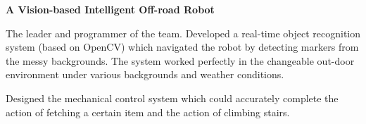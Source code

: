 \documentclass[margin,line,11pt]{resume}
\begin{document}
\begin{resume}
\textbf{A Vision-based Intelligent Off-road Robot}
\begin{list2}
\item The leader and programmer of the team. Developed a real-time object recognition system (based on OpenCV) which navigated the robot by detecting  markers from the messy backgrounds. The system worked perfectly in the changeable out-door environment under various backgrounds and  weather conditions.
\item Designed the mechanical control system which could accurately complete the action of fetching a certain item and the action of climbing stairs.
\end{list2}






    	

 	

 	       
\end{resume}   
\end{document}
